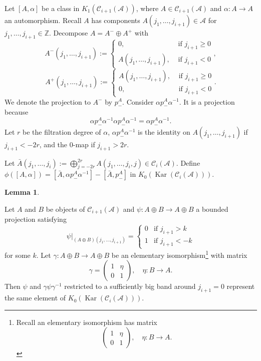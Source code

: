 \documentclass{article}
\theoremstyle{definition}
\newtheorem{lem}[theorem]{Lemma}
\newcommand{\CA}{{ \mathcal A}}
\newcommand{\ZZ}{{\mathbb Z}}
\begin{document}
Let $[A, \alpha]$ be a class in $K_1(\mathcal{C}_{i+1}(\CA))$, where $A\in \mathcal{C}_{i+1}(\CA)$ and $\alpha: A\rightarrow A$ an automorphism. Recall $A$ has components $A(j_1,\dots, j_{i+1}) \in \CA$ for $j_1, \dots, j_{i+1}\in \ZZ.$ Decompose $A=A^-\oplus A^+$ with 
$$A^-(j_1, \dots, j_{i+1}):=\begin{cases}
    0, &\text{ if } j_{i+1}\geq 0\\
    A(j_1, \dots, j_{i+1}), &\text{ if } j_{i+1}< 0
\end{cases},$$
$$A^+(j_1, \dots, j_{i+1}):=\begin{cases}
    A(j_1, \dots, j_{i+1}), &\text{ if } j_{i+1}\geq 0\\
    0, &\text{ if } j_{i+1}< 0
\end{cases}.$$
We denote the projection to $A^-$ by $p^A_-$. Consider $\alpha  p^A_-  \alpha^{-1}$. It is a projection because 
$$\alpha  p^A_-  \alpha^{-1}  \alpha  p^A_-  \alpha^{-1}=\alpha  p^A_-  \alpha^{-1}.$$ Let $r$ be the filtration degree of $\alpha$, $\alpha  p^A_-  \alpha^{-1}$ is the identity on $A(j_1, \dots, j_{i+1})$ if $j_{i+1}< -2r$, and the $0$-map if $j_{i+1}>2r$.

Let $\bar A(j_1, \dots, j_i):=\bigoplus_{j=-2r}^{2r}A(j_1,\dots, j_i, j)\in \mathcal{C}_{i}(\CA).$ Define $\phi([A, \alpha])=[\bar A, \alpha  p^A_-  \alpha^{-1}]-[\bar A,  p^A_- ]$ in $K_0(\operatorname{Kar}(\mathcal{C}_{i}(\CA)))$. 

\begin{lem}\label{lem:elementary}

Let $A$ and $B$ be objects of $\mathcal{C}_{i+1}(\CA)$ and $\psi : A \oplus B \to A \oplus B$ a bounded projection satisfying
\[
\psi|_{(A \oplus B)(j_1, \dots, j_{i+1})} = 
\begin{cases}
0 & \text{if } j_{i+1} > k \\
1 & \text{if } j_{i+1} < -k
\end{cases}
\]
for some $k$. Let $\gamma : A \oplus B \to A \oplus B$ be an elementary isomorphism\footnote{Recall an elementary isomorphism has matrix
\[
 \begin{pmatrix} 1 & \eta \\ 0 & 1 \end{pmatrix}, \quad \eta : B \to A.
\]} with matrix
\[
\gamma = \begin{pmatrix} 1 & \eta \\ 0 & 1 \end{pmatrix}, \quad \eta : B \to A.
\]
Then $\psi$ and $\gamma \psi \gamma^{-1}$ restricted to a sufficiently big band around $j_{i+1} = 0$ represent the same element of $K_0(\operatorname{Kar}(\mathcal{C}_{i}(\CA)))$.
\end{lem}
\end{document}
